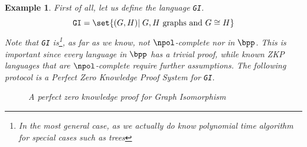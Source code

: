 \documentclass{article}
\newtheorem{example}{Example}
\begin{document}
\begin{example}
    First of all, let us define the language \texttt{GI}.
    \[ \texttt{GI} = \set{ (G, H) | \; G,H \text{ graphs and } G \cong H }\]
    Note that \texttt{GI} is\footnote{In the most general case, as we actually do know polynomial time algorithm for special cases such as trees}, as far as we know, not $\npol$-complete nor in $\bpp$.
    This is important since every language in $\bpp$ has a trivial proof, while known ZKP languages that are $\npol$-complete require further assumptions.
    The following protocol \cite{goldreichProofsThatYield1991} \cite{goldreichFoundationsCryptographyVol2007} is a Perfect Zero Knowledge Proof System for \texttt{GI}.

    \begin{figure}[H]
        \centering
        \caption{A perfect zero knowledge proof for Graph Isomorphism}
        \label{graphisomorphismzkp}
    \end{figure}


\end{example}
\end{document}
